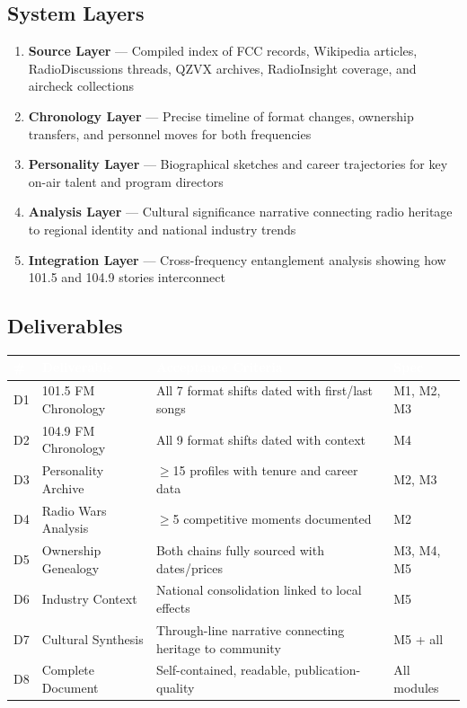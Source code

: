 \documentclass[11pt,letterpaper]{article}
\newcommand{\tableheader}[1]{\textbf{\sffamily\textcolor{white}{#1}}}
\begin{document}
\subsection{System Layers}

\begin{enumerate}[leftmargin=2em]
\item \textbf{Source Layer} --- Compiled index of FCC records, Wikipedia articles, RadioDiscussions threads, QZVX archives, RadioInsight coverage, and aircheck collections
\item \textbf{Chronology Layer} --- Precise timeline of format changes, ownership transfers, and personnel moves for both frequencies
\item \textbf{Personality Layer} --- Biographical sketches and career trajectories for key on-air talent and program directors
\item \textbf{Analysis Layer} --- Cultural significance narrative connecting radio heritage to regional identity and national industry trends
\item \textbf{Integration Layer} --- Cross-frequency entanglement analysis showing how 101.5 and 104.9 stories interconnect
\end{enumerate}

\subsection{Deliverables}

\begin{center}
\begin{tabularx}{\textwidth}{C{0.7cm}L{3.5cm}XL{2.5cm}}
\toprule
{}
\tableheader{\#} & \tableheader{Deliverable} & \tableheader{Acceptance Criteria} & \tableheader{Spec} \\
\midrule
D1 & 101.5 FM Chronology & All 7 format shifts dated with first/last songs & M1, M2, M3 \\
D2 & 104.9 FM Chronology & All 9 format shifts dated with context & M4 \\
D3 & Personality Archive & $\geq$15 profiles with tenure and career data & M2, M3 \\
D4 & Radio Wars Analysis & $\geq$5 competitive moments documented & M2 \\
D5 & Ownership Genealogy & Both chains fully sourced with dates/prices & M3, M4, M5 \\
D6 & Industry Context & National consolidation linked to local effects & M5 \\
D7 & Cultural Synthesis & Through-line narrative connecting heritage to community & M5 + all \\
D8 & Complete Document & Self-contained, readable, publication-quality & All modules \\
\bottomrule
\end{tabularx}
\end{center}
\end{document}
